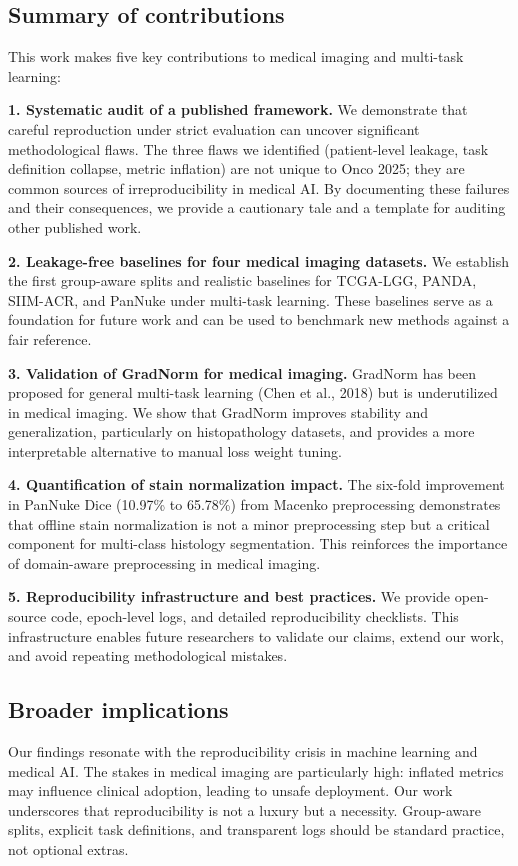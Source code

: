 \documentclass[conference,a4paper]{IEEEtran}
\begin{document}
\subsection{Summary of contributions}
This work makes five key contributions to medical imaging and multi-task learning:

\textbf{1. Systematic audit of a published framework.} We demonstrate that careful reproduction under strict evaluation can uncover significant methodological flaws. The three flaws we identified (patient-level leakage, task definition collapse, metric inflation) are not unique to Onco 2025; they are common sources of irreproducibility in medical AI. By documenting these failures and their consequences, we provide a cautionary tale and a template for auditing other published work.

\textbf{2. Leakage-free baselines for four medical imaging datasets.} We establish the first group-aware splits and realistic baselines for TCGA-LGG, PANDA, SIIM-ACR, and PanNuke under multi-task learning. These baselines serve as a foundation for future work and can be used to benchmark new methods against a fair reference.

\textbf{3. Validation of GradNorm for medical imaging.} GradNorm has been proposed for general multi-task learning (Chen et al., 2018) but is underutilized in medical imaging. We show that GradNorm improves stability and generalization, particularly on histopathology datasets, and provides a more interpretable alternative to manual loss weight tuning.

\textbf{4. Quantification of stain normalization impact.} The six-fold improvement in PanNuke Dice (10.97\% to 65.78\%) from Macenko preprocessing demonstrates that offline stain normalization is not a minor preprocessing step but a critical component for multi-class histology segmentation. This reinforces the importance of domain-aware preprocessing in medical imaging.

\textbf{5. Reproducibility infrastructure and best practices.} We provide open-source code, epoch-level logs, and detailed reproducibility checklists. This infrastructure enables future researchers to validate our claims, extend our work, and avoid repeating methodological mistakes.

\subsection{Broader implications}
Our findings resonate with the reproducibility crisis in machine learning and medical AI. The stakes in medical imaging are particularly high: inflated metrics may influence clinical adoption, leading to unsafe deployment. Our work underscores that reproducibility is not a luxury but a necessity. Group-aware splits, explicit task definitions, and transparent logs should be standard practice, not optional extras.
\end{document}
